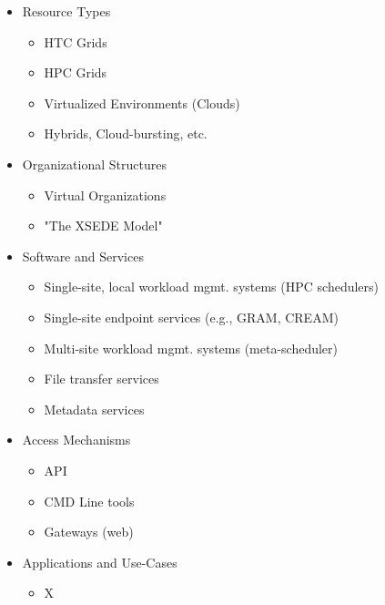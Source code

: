 \documentclass{sig-alternate}
\begin{document}
\begin{itemize}

    \item Resource Types

        \begin{itemize}
            \item HTC Grids
            \item HPC Grids
            \item Virtualized Environments (Clouds)
            \item Hybrids, Cloud-bursting, etc.
        \end{itemize}

    \item Organizational Structures

        \begin{itemize}
            \item Virtual Organizations
            \item "The XSEDE Model"
        \end{itemize}

    \item Software and Services

        \begin{itemize}
            \item Single-site, local workload mgmt. systems (HPC schedulers)
            \item Single-site endpoint services (e.g., GRAM, CREAM)
            \item Multi-site workload mgmt. systems (meta-scheduler)
            \item File transfer services
            \item Metadata services
        \end{itemize}

    \item Access Mechanisms

        \begin{itemize}
    	    \item API 
            \item CMD Line tools
            \item Gateways (web)
        \end{itemize}

    \item Applications and Use-Cases

        \begin{itemize}
            \item X
        \end{itemize}

\end{itemize}
\end{document}

